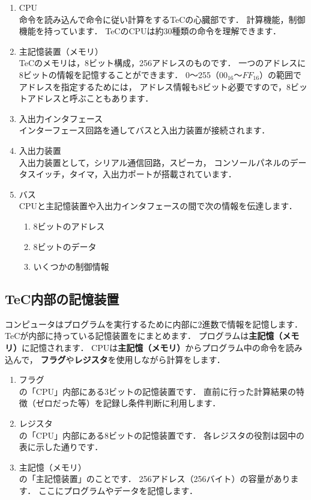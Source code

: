 \begin{enumerate}
\item CPU \\
命令を読み込んで命令に従い計算をするTeCの心臓部です．
計算機能，制御機能を持っています．
TeCのCPUは約30種類の命令を理解できます．
\item 主記憶装置（メモリ） \\
TeCのメモリは，8ビット構成，256アドレスのものです．
一つのアドレスに8ビットの情報を記憶することができます．
0〜255（$00_{16}$〜$FF_{16}$）の範囲でアドレスを指定するためには，
アドレス情報も8ビット必要ですので，8ビットアドレスと呼ぶこともあります．
\item 入出力インタフェース \\
インターフェース回路を通してバスと入出力装置が接続されます．
\item 入出力装置 \\
入出力装置として，シリアル通信回路，スピーカ，
コンソールパネルのデータスイッチ，タイマ，入出力ポートが搭載されています．
\item バス \\
CPUと主記憶装置や入出力インタフェースの間で次の情報を伝達します．
\begin{enumerate}
\item 8ビットのアドレス
\item 8ビットのデータ
\item いくつかの制御情報
\end{enumerate}
\end{enumerate}

\subsection{TeC内部の記憶装置}
コンピュータはプログラムを実行するために内部に2進数で情報を記憶します．
TeCが内部に持っている記憶装置をにまとめます．
プログラムは{\bf 主記憶（メモリ）}に記憶されます．
CPUは{\bf 主記憶（メモリ）}からプログラム中の命令を読み込んで，
{\bf フラグ}や{\bf レジスタ}を使用しながら計算をします．


\begin{enumerate}
\item フラグ \\
の「CPU」内部にある3ビットの記憶装置です．
直前に行った計算結果の特徴（ゼロだった等）を記録し条件判断に利用します．
\item レジスタ \\
の「CPU」内部にある8ビットの記憶装置です．
各レジスタの役割は図中の表に示した通りです．
\item 主記憶（メモリ） \\
の「主記憶装置」のことです．
256アドレス（256バイト）の容量があります．
ここにプログラムやデータを記憶します．
\end{enumerate}

